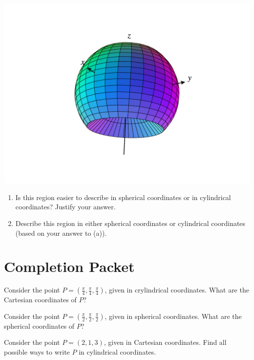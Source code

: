 \documentclass{ximera}
\begin{document}
\begin{problem}
\begin{image}
\includegraphics[width=\textwidth]{CalcPlot3D-pp_2}
\end{image}

\begin{enumerate}
\item Is this region easier to describe in spherical coordinates or in cylindrical coordinates? Justify your answer.
\item Describe this region in either spherical coordinates or cylindrical coordinates (based on your answer to (a)).
\end{enumerate}

\end{problem}

\section*{Completion Packet}

\begin{problem}
Consider the point $P=\left(\frac{\pi}{4}, \frac{\pi}{4}, \frac{\pi}{4}\right)$, given in crylindrical coordinates. What are the Cartesian coordinates of $P$?
\end{problem}

\begin{problem}
Consider the point $P=\left(\frac{\pi}{2}, \frac{\pi}{2}, \frac{\pi}{2}\right)$, given in spherical coordinates. What are the spherical coordinates of $P$?
\end{problem}

\begin{problem}
Consider the point $P = (2,1,3)$, given in Cartesian coordinates. Find all possible ways to write $P$ in cylindrical coordinates.
\end{problem}
\end{document}
